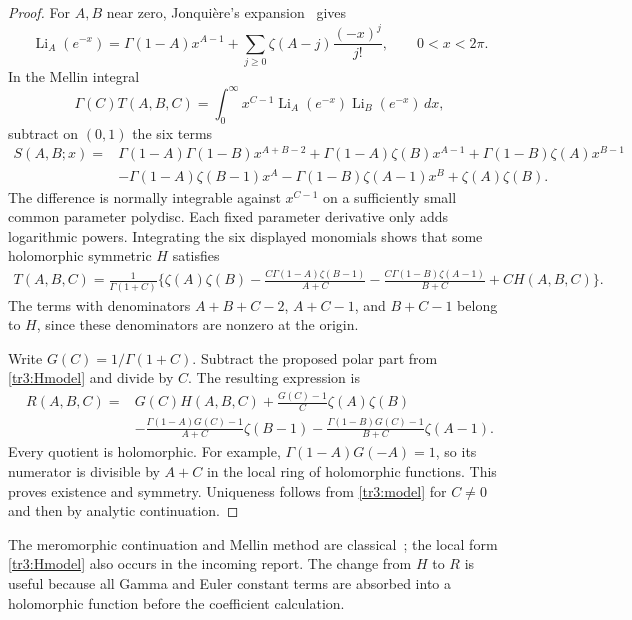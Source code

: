 \documentclass[11pt]{article}
\numberwithin{equation}{section}
\theoremstyle{plain}
\theoremstyle{definition}
\theoremstyle{remark}
\begin{document}
\begin{proof}
For $A,B$ near zero, Jonqui\`ere's expansion~\cite[\S25.12(ii)]{tr3:DLMF} gives
\[
 \operatorname{Li}_A(e^{-x})
 =\Gamma(1-A)x^{A-1}
   +\sum_{j\geq0}\zeta(A-j)\frac{(-x)^j}{j!},\qquad 0<x<2\pi.
\]
In the Mellin integral
\[
 \Gamma(C)T(A,B,C)=\int_0^\infty
 x^{C-1}\operatorname{Li}_A(e^{-x})\operatorname{Li}_B(e^{-x})\,dx,
\]
subtract on $(0,1)$ the six terms
\begin{align*}
 S(A,B;x)={}&\Gamma(1-A)\Gamma(1-B)x^{A+B-2}
 +\Gamma(1-A)\zeta(B)x^{A-1}
 +\Gamma(1-B)\zeta(A)x^{B-1}\\
 &-\Gamma(1-A)\zeta(B-1)x^A
 -\Gamma(1-B)\zeta(A-1)x^B+\zeta(A)\zeta(B).
\end{align*}
The difference is normally integrable against $x^{C-1}$ on a sufficiently
small common parameter polydisc.  Each fixed parameter derivative only
adds logarithmic powers.  Integrating the six displayed monomials shows
that some holomorphic symmetric $H$ satisfies
\begin{align}\label{tr3:Hmodel}
 T(A,B,C)=\frac{1}{\Gamma(1+C)}\biggl\{
 \zeta(A)\zeta(B)
 -\frac{C\Gamma(1-A)\zeta(B-1)}{A+C}
 -\frac{C\Gamma(1-B)\zeta(A-1)}{B+C}+C H(A,B,C)\biggr\}.
\end{align}
The terms with denominators $A+B+C-2$, $A+C-1$, and $B+C-1$ belong
to $H$, since these denominators are nonzero at the origin.

Write $G(C)=1/\Gamma(1+C)$.  Subtract the proposed polar part from
\eqref{tr3:Hmodel} and divide by $C$.  The resulting expression is
\begin{align*}
 R(A,B,C)={}&G(C)H(A,B,C)
  +\frac{G(C)-1}{C}\zeta(A)\zeta(B)\\
 &-\frac{\Gamma(1-A)G(C)-1}{A+C}\zeta(B-1)
  -\frac{\Gamma(1-B)G(C)-1}{B+C}\zeta(A-1).
\end{align*}
Every quotient is holomorphic.  For example,
$\Gamma(1-A)G(-A)=1$, so its numerator is divisible by $A+C$ in
the local ring of holomorphic functions.  This proves existence and
symmetry.  Uniqueness follows from \eqref{tr3:model} for $C\ne0$ and
then by analytic continuation.
\end{proof}

The meromorphic continuation and Mellin method are classical~\cite{tr3:BD,tr3:SS}; the local
form \eqref{tr3:Hmodel} also occurs in the incoming report.  The change
from $H$ to $R$ is useful because all Gamma and Euler constant terms
are absorbed into a holomorphic function before the coefficient
calculation.
\end{document}
